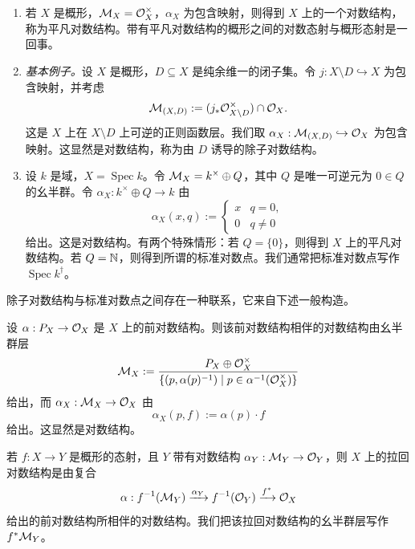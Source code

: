 \begin{examples}
\begin{enumerate}[label=(\arabic*),start=0,leftmargin=*]
\item 若 $X$ 是概形，$\mathcal{M}_X=\mathcal{O}_X^{\times}$，$\alpha_X$ 为包含映射，则得到 $X$ 上的一个对数结构，称为平凡对数结构。带有平凡对数结构的概形之间的对数态射与概形态射是一回事。
\item \textit{基本例子。}设 $X$ 是概形，$D\subseteq X$ 是纯余维一的闭子集。令 $j:X\setminus D\hookrightarrow X$ 为包含映射，并考虑
\[
  \mathcal{M}_{(X,D)}:=(j_*\mathcal{O}_{X\setminus D}^{\times})\cap\mathcal{O}_X.
\]
这是 $X$ 上在 $X\setminus D$ 上可逆的正则函数层。我们取 $\alpha_X:\mathcal{M}_{(X,D)}\hookrightarrow\mathcal{O}_X$ 为包含映射。这显然是对数结构，称为由 $D$ 诱导的除子对数结构。
\item 设 $k$ 是域，$X=\operatorname{Spec} k$。令 $\mathcal{M}_X=k^{\times}\oplus Q$，其中 $Q$ 是唯一可逆元为 $0\in Q$ 的幺半群。令 $\alpha_X:k^{\times}\oplus Q\to k$ 由
\[
  \alpha_X(x,q):=
  \begin{cases}
    x & q=0,\\
    0 & q\ne 0
  \end{cases}
\]
给出。这是对数结构。有两个特殊情形：若 $Q=\{0\}$，则得到 $X$ 上的平凡对数结构。若 $Q=\mathbb{N}$，则得到所谓的标准对数点。我们通常把标准对数点写作 $\operatorname{Spec} k^\dagger$。
\end{enumerate}
\end{examples}

除子对数结构与标准对数点之间存在一种联系，它来自下述一般构造。

\begin{definition}
设 $\alpha:P_X\to\mathcal{O}_X$ 是 $X$ 上的前对数结构。则该前对数结构相伴的对数结构由幺半群层
\[
  \mathcal{M}_X:=\frac{P_X\oplus\mathcal{O}_X^{\times}}{\{(p,\alpha(p)^{-1})\mid p\in\alpha^{-1}(\mathcal{O}_X^{\times})\}}
\]
给出，而 $\alpha_X:\mathcal{M}_X\to\mathcal{O}_X$ 由
\[
  \alpha_X(p,f):=\alpha(p)\cdot f
\]
给出。这显然是对数结构。
\end{definition}

\begin{definition}
若 $f:X\to Y$ 是概形的态射，且 $Y$ 带有对数结构 $\alpha_Y:\mathcal{M}_Y\to\mathcal{O}_Y$，则 $X$ 上的拉回对数结构是由复合
\[
  \alpha:f^{-1}(\mathcal{M}_Y)\xrightarrow{\alpha_Y}f^{-1}(\mathcal{O}_Y)\xrightarrow{f^*}\mathcal{O}_X
\]
给出的前对数结构所相伴的对数结构。我们把该拉回对数结构的幺半群层写作 $f^*\mathcal{M}_Y$。
\end{definition}

